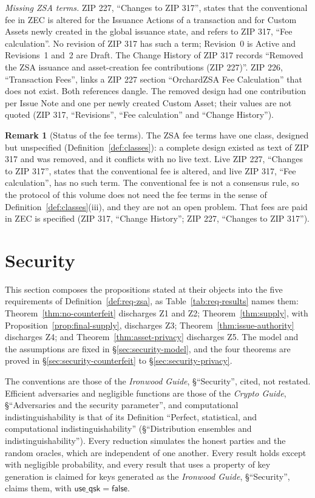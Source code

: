 \documentclass[11pt,a4paper]{article}
\theoremstyle{definition}
\newtheorem{remark}[theorem]{Remark}
\begin{document}
\emph{Missing ZSA terms.} ZIP 227, ``Changes to ZIP 317'', states that the
conventional fee in ZEC is altered for the Issuance Actions of a
transaction and for Custom Assets newly created in the global issuance
state, and refers to ZIP 317, ``Fee calculation''. No revision of ZIP 317
has such a term; Revision~0 is Active and Revisions~1 and~2 are Draft. The
Change History of ZIP 317 records ``Removed the ZSA issuance and
asset-creation fee contributions (ZIP 227)''. ZIP 226, ``Transaction
Fees'', links a ZIP 227 section ``OrchardZSA Fee Calculation'' that does
not exist. Both references dangle. The removed design had one
contribution per Issue Note and one per newly created Custom Asset; their
values are not quoted (ZIP 317, ``Revisions'', ``Fee calculation'' and
``Change History'').

\begin{remark}[Status of the fee terms]\label{rem:fees-status}
The ZSA fee terms have one class, designed but unspecified
(Definition~\ref{def:classes}): a complete design existed as text of ZIP
317 and was removed, and it conflicts with no live text. Live ZIP 227,
``Changes to ZIP 317'', states that the conventional fee is altered, and
live ZIP 317, ``Fee calculation'', has no such term. The conventional fee
is not a consensus rule, so the protocol of this volume does not need the
fee terms in the sense of Definition~\ref{def:classes}(iii), and they are
not an open problem. That fees are paid in ZEC is specified (ZIP 317,
``Change History''; ZIP 227, ``Changes to ZIP 317'').
\end{remark}

\section{Security}\label{sec:security}

This section composes the propositions stated at their objects into the
five requirements of Definition~\ref{def:req-zsa}, as
Table~\ref{tab:req-results} names them: Theorem~\ref{thm:no-counterfeit}
discharges Z1 and Z2; Theorem~\ref{thm:supply}, with
Proposition~\ref{prop:final-supply}, discharges Z3;
Theorem~\ref{thm:issue-authority} discharges Z4; and
Theorem~\ref{thm:asset-privacy} discharges Z5. The model and the
assumptions are fixed in \S\ref{sec:security-model}, and the four
theorems are proved in \S\ref{sec:security-counterfeit} to
\S\ref{sec:security-privacy}.

The conventions are those of the \emph{Ironwood Guide}, \S``Security'',
cited, not restated. Efficient adversaries and negligible functions are
those of the \emph{Crypto Guide}, \S``Adversaries and the security
parameter'', and computational indistinguishability is that of its
Definition ``Perfect, statistical, and computational indistinguishability''
(\S``Distribution ensembles and indistinguishability''). Every reduction
simulates the honest parties and the random oracles, which are independent
of one another. Every result holds except with negligible probability, and
every result that uses a property of key generation is claimed for keys
generated as the \emph{Ironwood Guide}, \S``Security'', claims them, with
$\mathsf{use\_qsk} = \mathsf{false}$.
\end{document}
